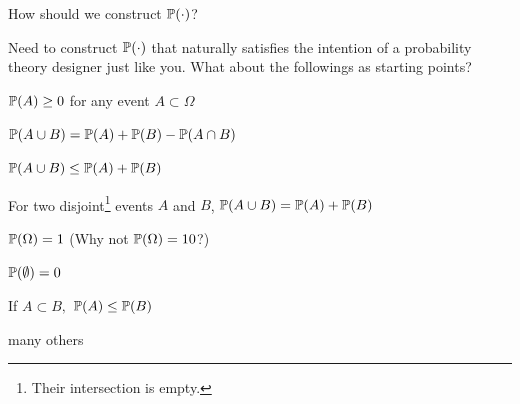 \begin{frame}{How should we construct $\mathbb{P}( \cdot )$?}

\plitemsep 0.1in

\bci [$\bullet$]

\item Need to construct $\mathbb{P}( \cdot )$ that naturally satisfies the intention of a probability theory designer just like you. What about the followings as starting points? 

\medskip

\bci
\item<2-> $\mathbb{P}( A ) \geq 0$ for any event $A \subset \Omega$

\item<3-> $\mathbb{P}( A \cup B ) = \mathbb{P}( A ) + \mathbb{P}( B ) - \mathbb{P}( A \cap B )$

\item<3-> $\mathbb{P}( A \cup B ) \leq  \mathbb{P}( A ) + \mathbb{P}( B )$ 

\item<3-> For two disjoint\footnote{Their intersection is empty.} events $A$ and $B$, $\mathbb{P}( A \cup B ) = \mathbb{P}( A ) + \mathbb{P}( B )$

\item<4-> $\mathbb{P}( \Omega ) = 1$ (Why not $\mathbb{P}( \Omega ) = 10$?)

\item<4-> $\mathbb{P}( \emptyset ) = 0$

\item<5-> If $A \subset B,$ $\mathbb{P}( A ) \leq \mathbb{P}( B )$

\item<5-> many others
\eci
\eci

\end{frame}

